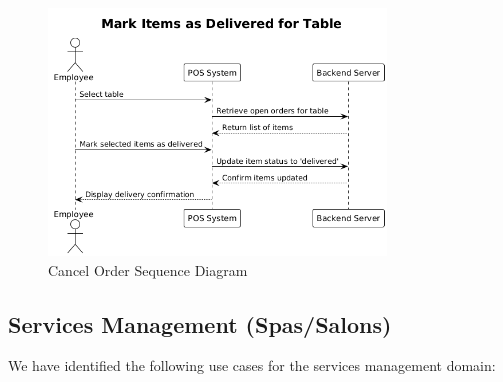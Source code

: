 \documentclass[]{VUMIFTemplateClass}
\begin{document}
\begin{figure}[H]
    \centering
    \includegraphics[width=0.8\textwidth]{docs/ps-design/design-document/images/diagrams/services/order_mark_items_delivered_sequence.png}
    \caption{Cancel Order Sequence Diagram}
    \label{fig:cancel_order_sequence}
\end{figure}


\subsection{Services Management (Spas/Salons)}

%


We have identified the following use cases for the services management domain:
\end{document}
